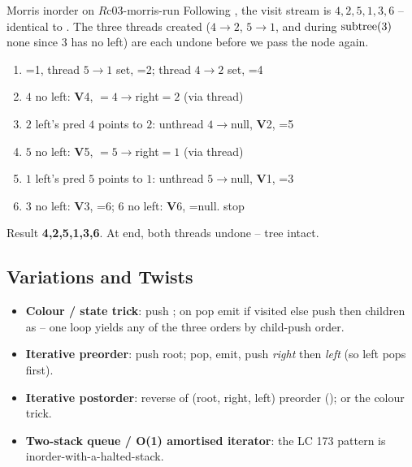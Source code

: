 \begin{example}{Morris inorder on $R$}{c03-morris-run}
Following , the visit stream is $4,2,5,1,3,6$ -- identical to
. The three threads created ($4\!\to\!2$, $5\!\to\!1$, and during
$\operatorname{subtree}(3)$ none since $3$ has no left) are each undone before we pass the node again.
\end{example}
\begin{tracebox}[Thread life-cycle on $R$ (\textbf{V} = visit)]
\begin{enumerate}[nosep, leftmargin=1.8em]
  \item {}=1, thread $5\to1$ set, =2; thread $4\to2$ set, =4
  \item $4$ no left: \textbf{V}4, $=4\to$right$=2$ (via thread)
  \item $2$ left's pred $4$ points to $2$: unthread $4\to$null, \textbf{V}2, =5
  \item $5$ no left: \textbf{V}5, $=5\to$right$=1$ (via thread)
  \item $1$ left's pred $5$ points to $1$: unthread $5\to$null, \textbf{V}1, =3
  \item $3$ no left: \textbf{V}3, =6; $6$ no left: \textbf{V}6, =null. stop
\end{enumerate}
Result \textbf{4,2,5,1,3,6}. At end, both threads undone -- tree intact.
\end{tracebox}

\subsection{Variations and Twists}

\begin{itemize}[nosep]
  \item \textbf{Colour / state trick}: push ; on pop emit if
        visited else push  then children as  -- one loop
        yields any of the three orders by child-push order.           \hfill{}
  \item \textbf{Iterative preorder}: push root; pop, emit, push \emph{right} then
        \emph{left} (so left pops first).                             \hfill{}
  \item \textbf{Iterative postorder}: reverse of (root, right, left) preorder
        (); or the colour trick.                 \hfill{}
  \item \textbf{Two-stack queue / O(1) amortised iterator}: the LC 173 pattern is
        inorder-with-a-halted-stack.                                  \hfill{}
\end{itemize}

